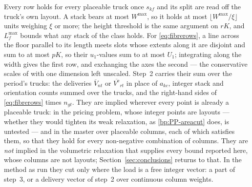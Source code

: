 Every row holds for every placeable truck once $s_{kf}$ and its split
are read off the truck's own layout. A stack bears at most $W^{\max}$,
so it holds at most $\lfloor W^{\max}/\xi\rfloor$ units weighing $\xi$
or more; the height threshold is the same argument on $rK$, and
$L^{\max}_{f}$ bounds what any stack of the class holds. For
\eqref{eq:fibrerows}, a line across the floor parallel to its length
meets slots whose extents along it are disjoint and sum to at most
$pK$, so their $u_{1}$-values sum to at most $U_{1}$; integrating along
the width gives the first row, and exchanging the axes the second ---
the conservative scales of \textcite{FeketeSchepers2004} with one
dimension left unscaled. Step~2 carries their sum over the
period's trucks: the deliveries $\overline{V}_{nt}$ or
$\overline{V^{\mathrm{e}}}_{rt}$ in place of $a_{kc}$, integer stack
and orientation counts summed over the trucks, and the right-hand sides
of \eqref{eq:fibrerows} times $n_{gt}$. They are implied wherever every
point is already a placeable truck: in the pricing problem, whose
integer points are layouts --- whether they would tighten its weak
relaxation, as \eqref{bp:PP-areacut} does, is untested --- and in the
master over placeable columns, each of which satisfies them, so that
they hold for every non-negative combination of columns. They are \emph{not} implied
in the volumetric relaxation that supplies every bound reported here,
whose columns are not layouts; Section~\ref{sec:conclusions} returns
to that. In the method as run they cut only where the load is a free
integer vector: a part of step~3, or a delivery vector of step~2 over
continuous column weights.